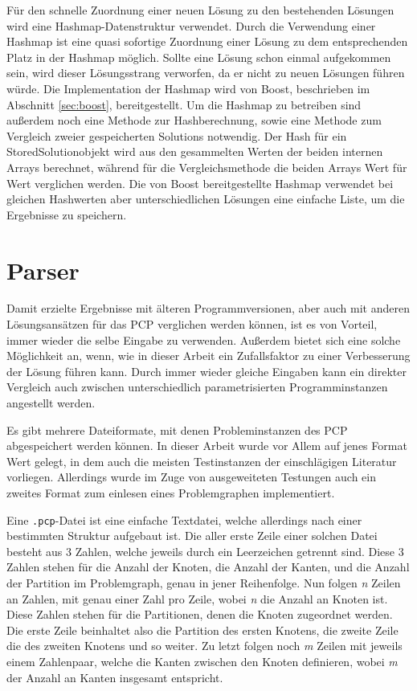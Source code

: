 Für den schnelle Zuordnung einer neuen Lösung zu den bestehenden Lösungen wird eine Hashmap-Datenstruktur verwendet. Durch die Verwendung einer
Hashmap ist eine quasi sofortige Zuordnung einer Lösung zu dem entsprechenden Platz in der Hashmap möglich. Sollte eine Lösung schon einmal 
aufgekommen sein, wird dieser Lösungsstrang verworfen, da er nicht zu neuen Lösungen führen würde. Die Implementation der Hashmap wird von 
Boost, beschrieben im Abschnitt \ref{sec:boost}, bereitgestellt. Um die Hashmap zu betreiben sind außerdem noch eine Methode zur Hashberechnung,
sowie eine Methode zum Vergleich zweier gespeicherten Solutions notwendig. Der Hash für ein StoredSolutionobjekt wird aus den gesammelten Werten
der beiden internen Arrays berechnet, während für die Vergleichsmethode die beiden Arrays Wert für Wert verglichen werden. Die von Boost 
bereitgestellte Hashmap verwendet bei gleichen Hashwerten aber unterschiedlichen Lösungen eine einfache Liste, um die Ergebnisse zu speichern.

\section{Parser}
\label{sec:parser}

Damit erzielte Ergebnisse mit älteren Programmversionen, aber auch mit anderen Lösungsansätzen für das PCP verglichen werden können, ist es von
Vorteil, immer wieder die selbe Eingabe zu verwenden. Außerdem bietet sich eine solche Möglichkeit an, wenn, wie in dieser Arbeit ein Zufallsfaktor
zu einer Verbesserung der Lösung führen kann. Durch immer wieder gleiche Eingaben kann ein direkter Vergleich auch zwischen unterschiedlich
parametrisierten Programminstanzen angestellt werden.

Es gibt mehrere Dateiformate, mit denen Probleminstanzen des PCP abgespeichert werden können. In dieser Arbeit wurde vor Allem auf jenes
Format Wert gelegt, in dem auch die meisten Testinstanzen der einschlägigen Literatur vorliegen. Allerdings wurde im Zuge von ausgeweiteten 
Testungen auch ein zweites Format zum einlesen eines Problemgraphen implementiert. 

Eine \texttt{.pcp}-Datei ist eine einfache Textdatei, welche allerdings nach einer bestimmten Struktur aufgebaut ist. Die aller erste Zeile
einer solchen Datei besteht aus 3 Zahlen, welche jeweils durch ein Leerzeichen getrennt sind. Diese 3 Zahlen stehen für die Anzahl der Knoten, 
die Anzahl der Kanten, und die Anzahl der Partition im Problemgraph, genau in jener Reihenfolge. Nun folgen \textit{n} Zeilen an Zahlen, mit 
genau einer Zahl pro Zeile, wobei \textit{n} die Anzahl an Knoten ist. Diese Zahlen stehen für die Partitionen, denen die Knoten zugeordnet werden.
Die erste Zeile beinhaltet also die Partition des ersten Knotens, die zweite Zeile die des zweiten Knotens und so weiter. Zu letzt folgen noch
\textit{m} Zeilen mit jeweils einem Zahlenpaar, welche die Kanten zwischen den Knoten definieren, wobei \textit{m} der Anzahl an Kanten insgesamt
entspricht.

